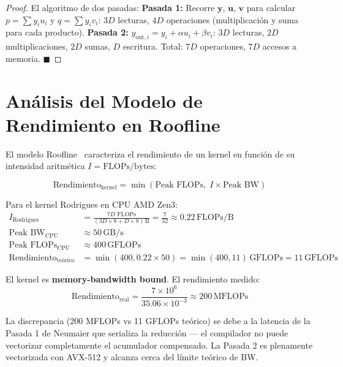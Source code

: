 \begin{proof}
El algoritmo de dos pasadas:
\textbf{Pasada 1:} Recorre $\mathbf{y}$, $\mathbf{u}$, $\mathbf{v}$ para calcular $p = \sum y_i u_i$
y $q = \sum y_i v_i$: $3D$ lecturas, $4D$ operaciones (multiplicación y suma para cada producto).
\textbf{Pasada 2:} $y_{\text{out},i} = y_i + \alpha u_i + \beta v_i$: $3D$ lecturas,
$2D$ multiplicaciones, $2D$ sumas, $D$ escritura. Total: $7D$ operaciones, $7D$ accesos a memoria. $\blacksquare$
\end{proof}

\section{Análisis del Modelo de Rendimiento en Roofline}

El modelo Roofline~\cite{williams2009roofline} caracteriza el rendimiento de un kernel
en función de su intensidad aritmética $I = \text{FLOPs}/\text{bytes}$:

\begin{equation}
\text{Rendimiento}_{\text{kernel}} = \min\left(\text{Peak FLOPs},\; I \times \text{Peak BW}\right)
\end{equation}

Para el kernel Rodrigues en CPU AMD Zen3:
\begin{align}
I_{\text{Rodrigues}} &= \frac{7D \text{ FLOPs}}{(3D \times 8 + D \times 8)\,\text{B}} = \frac{7}{32} \approx 0.22\,\text{FLOPs/B} \\
\text{Peak BW}_{\text{CPU}} &\approx 50\,\text{GB/s} \\
\text{Peak FLOPs}_{\text{CPU}} &\approx 400\,\text{GFLOPs} \\
\text{Rendimiento}_{\text{teórico}} &= \min(400, 0.22 \times 50) = \min(400, 11)\,\text{GFLOPs} = 11\,\text{GFLOPs}
\end{align}

El kernel es \textbf{memory-bandwidth bound}. El rendimiento medido:
\begin{equation}
\text{Rendimiento}_{\text{real}} = \frac{7 \times 10^6}{35.06 \times 10^{-3}} \approx 200\,\text{MFLOPs}
\end{equation}

La discrepancia (200 MFLOPs vs 11 GFLOPs teórico) se debe a la latencia de la Pasada 1
de Neumaier que serializa la reducción --- el compilador no puede vectorizar completamente
el acumulador compensado. La Pasada 2 es plenamente vectorizada con AVX-512 y alcanza
cerca del límite teórico de BW.

